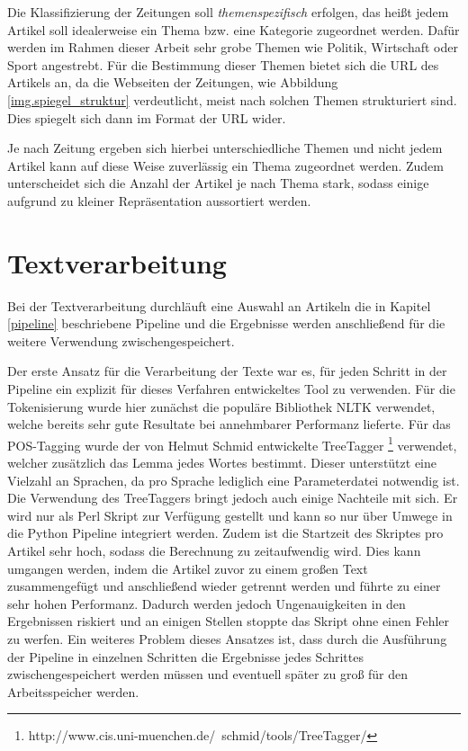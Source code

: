 Die Klassifizierung der Zeitungen soll \emph{themenspezifisch} erfolgen, das heißt jedem Artikel soll idealerweise ein Thema bzw. eine Kategorie zugeordnet werden. Dafür werden im Rahmen dieser Arbeit sehr grobe Themen wie Politik, Wirtschaft oder Sport angestrebt. Für die Bestimmung dieser Themen bietet sich die URL des Artikels an, da die Webseiten der Zeitungen, wie Abbildung \ref{img.spiegel_struktur} verdeutlicht, meist nach solchen Themen strukturiert sind. Dies spiegelt sich dann im Format der URL wider.


Je nach Zeitung ergeben sich hierbei unterschiedliche Themen und nicht jedem Artikel kann auf diese Weise zuverlässig ein Thema zugeordnet werden. Zudem unterscheidet sich die Anzahl der Artikel je nach Thema stark, sodass einige aufgrund zu kleiner Repräsentation aussortiert werden.

\section{Textverarbeitung}\label{textprocessing}
Bei der Textverarbeitung durchläuft eine Auswahl an Artikeln die in Kapitel \ref{pipeline} beschriebene Pipeline und die Ergebnisse werden anschließend für die weitere Verwendung zwischengespeichert.

Der erste Ansatz für die Verarbeitung der Texte war es, für jeden Schritt in der Pipeline ein explizit für dieses Verfahren entwickeltes Tool zu verwenden. Für die Tokenisierung wurde hier zunächst die populäre Bibliothek NLTK verwendet, welche bereits sehr gute Resultate bei annehmbarer Performanz lieferte. Für das POS-Tagging wurde der von Helmut Schmid entwickelte TreeTagger \footnote{http://www.cis.uni-muenchen.de/~schmid/tools/TreeTagger/} verwendet, welcher zusätzlich das Lemma jedes Wortes bestimmt. Dieser unterstützt eine Vielzahl an Sprachen, da pro Sprache lediglich eine Parameterdatei notwendig ist. Die Verwendung des TreeTaggers bringt jedoch auch einige Nachteile mit sich. Er wird nur als Perl Skript zur Verfügung gestellt und kann so nur über Umwege in die Python Pipeline integriert werden. Zudem ist die Startzeit des Skriptes pro Artikel sehr hoch, sodass die Berechnung zu zeitaufwendig wird. Dies kann umgangen werden, indem die Artikel zuvor zu einem großen Text zusammengefügt und anschließend wieder getrennt werden und führte zu einer sehr hohen Performanz. Dadurch werden jedoch Ungenauigkeiten in den Ergebnissen riskiert und an einigen Stellen stoppte das Skript ohne einen Fehler zu werfen. Ein weiteres Problem dieses Ansatzes ist, dass durch die Ausführung der Pipeline in einzelnen Schritten die Ergebnisse jedes Schrittes zwischengespeichert werden müssen und eventuell später zu groß für den Arbeitsspeicher werden.

